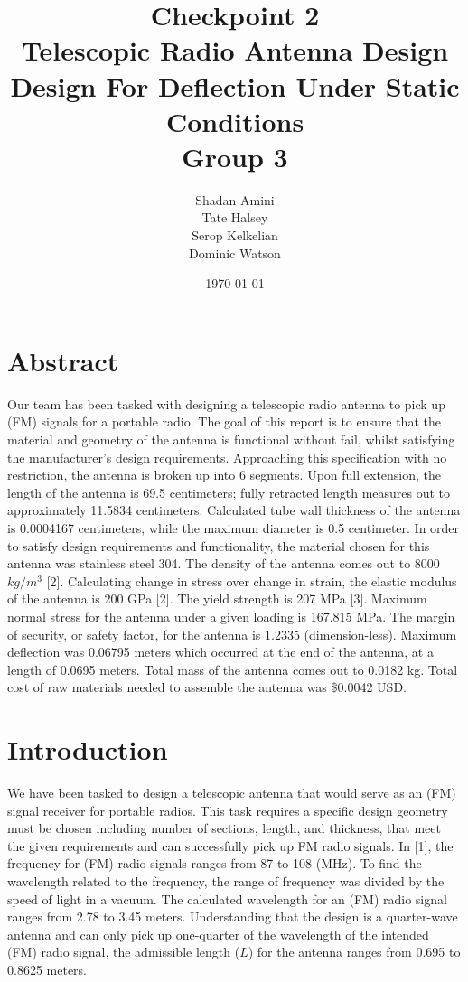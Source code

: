 \documentclass[12pt]{article}
\title{Checkpoint 2\\Telescopic Radio Antenna Design\\Design For Deflection Under Static Conditions\\Group 3}
\author{Shadan Amini\\Tate Halsey\\Serop Kelkelian\\Dominic Watson}
\date{\today}
\begin{document}
%
\maketitle
\newpage

\tableofcontents
\newpage

\section{Abstract}
Our team has been tasked with designing a telescopic radio antenna to pick up (FM) signals for a portable radio. The goal of this report is to ensure that the material and geometry of the antenna is functional without fail, whilst satisfying the manufacturer’s design requirements. Approaching this specification with no restriction, the antenna is broken up into 6 segments. Upon full extension, the length of the antenna is 69.5 centimeters; fully retracted length measures out to approximately 11.5834 centimeters. Calculated tube wall thickness of the antenna is 0.0004167 centimeters, while the maximum diameter is 0.5 centimeter. In order to satisfy design requirements and functionality, the material chosen for this antenna was stainless steel 304. The density of the antenna comes out to 8000 $kg/m^3$ [2]. Calculating change in stress over change in strain, the elastic modulus of the antenna is 200 GPa [2]. The yield strength is 207 MPa [3]. Maximum normal stress for the antenna under a given loading is 167.815 MPa. The margin of security, or safety factor, for the antenna is 1.2335 (dimension-less). Maximum deflection was 0.06795 meters which occurred at the end of the antenna, at a length of 0.0695 meters. Total mass of the antenna comes out to 0.0182 kg. Total cost of raw materials needed to assemble the antenna was \$0.0042 USD.
\newpage

\section{Introduction}
We have been tasked to design a telescopic antenna that would serve as an (FM) signal receiver for portable radios. This task requires a specific design geometry must be chosen including number of sections, length, and thickness, that meet the given requirements and can successfully pick up FM radio signals. In [1], the frequency for (FM) radio signals ranges from 87 to 108 (MHz). To find the wavelength related to the frequency, the range of frequency was divided by the speed of light in a vacuum. The calculated wavelength for an (FM) radio signal ranges from 2.78 to 3.45 meters. Understanding that the design is a quarter-wave antenna and can only pick up one-quarter of the wavelength of the intended (FM) radio signal, the admissible length ($L$) for the antenna ranges from 0.695 to 0.8625 meters.
\newpage
\end{document}
